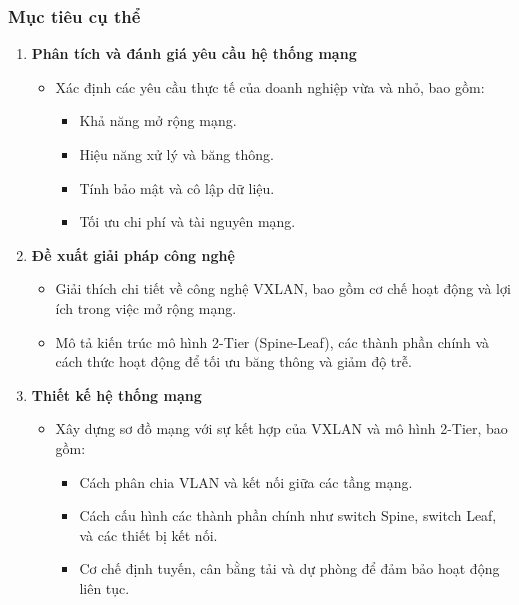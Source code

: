 \documentclass[13pt]{article}
\begin{document}
    \subsubsection{Mục tiêu cụ thể}
    \begin{enumerate}
        \item \textbf{Phân tích và đánh giá yêu cầu hệ thống mạng}
        \begin{itemize}
            \item Xác định các yêu cầu thực tế của doanh nghiệp vừa và nhỏ, bao gồm:
            \begin{itemize}
                \item Khả năng mở rộng mạng.
                \item Hiệu năng xử lý và băng thông.
                \item Tính bảo mật và cô lập dữ liệu.
                \item Tối ưu chi phí và tài nguyên mạng.
            \end{itemize}
        \end{itemize}
        
        \item \textbf{Đề xuất giải pháp công nghệ}
        \begin{itemize}
            \item Giải thích chi tiết về công nghệ VXLAN, bao gồm cơ chế hoạt động và lợi ích trong việc mở rộng mạng.
            \item Mô tả kiến trúc mô hình 2-Tier (Spine-Leaf), các thành phần chính và cách thức hoạt động để tối ưu băng thông và giảm độ trễ.
        \end{itemize}

        \item \textbf{Thiết kế hệ thống mạng}
        \begin{itemize}
            \item Xây dựng sơ đồ mạng với sự kết hợp của VXLAN và mô hình 2-Tier, bao gồm:
            \begin{itemize}
                \item Cách phân chia VLAN và kết nối giữa các tầng mạng.
                \item Cách cấu hình các thành phần chính như switch Spine, switch Leaf, và các thiết bị kết nối.
                \item Cơ chế định tuyến, cân bằng tải và dự phòng để đảm bảo hoạt động liên tục.
            \end{itemize}
        \end{itemize}


\end{enumerate}
\end{document}
